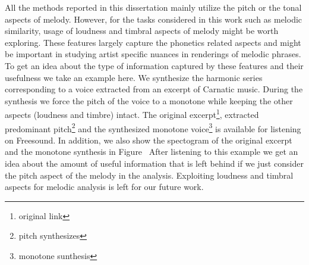 {All the methods reported in this dissertation mainly utilize the pitch or the tonal aspects of melody. However, for the tasks considered in this work such as melodic similarity, usage of loudness and timbral aspects of melody might be worth exploring. These features largely capture the phonetics related aspects and might be important in studying artist specific nuances in renderings of melodic phrases. To get an idea about the type of information captured by these features and their usefulness we take an example here. We synthesize the harmonic series corresponding to a voice extracted from an excerpt of Carnatic music. During the synthesis we force the pitch of the voice to a monotone while keeping the other aspects (loudness and timbre) intact. The original excerpt\footnote{original link}, extracted predominant pitch\footnote{pitch synthesizes} and the synthesized monotone voice\footnote{monotone sunthesis} is available for listening on Freesound. In addition, we also show the spectogram of the original excerpt and the monotone synthesis in Figure~\TODO{} After listening to this example we get an idea about the amount of useful information that is left behind if we just consider the pitch aspect of the melody in the analysis. Exploiting loudness and timbral aspects for melodic analysis is left for our future work.


}
